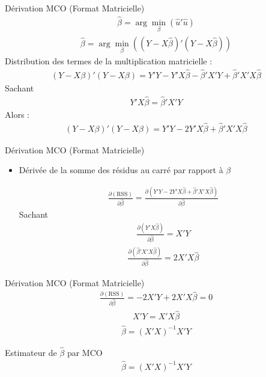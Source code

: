 \documentclass{beamer}
\begin{document}
\begin{frame}{Dérivation MCO (Format Matricielle)}
\begin{align*}
  \hat{\beta} = \arg\min_{\beta} (\hat{u}'\hat{u})
\end{align*}
\begin{align*}
  \hat{\beta} = \arg\min_{\beta} \left( (Y - X \hat{\beta})' (Y - X \hat{\beta}) \right)
\end{align*}
Distribution des termes de la multiplication matricielle :
\begin{align*}
  (Y - X \beta)' (Y - X \beta) = Y'Y - Y'X \hat{\beta} - \hat{\beta}'X'Y + \hat{\beta}'X'X \hat{\beta}
\end{align*}
Sachant 
\begin{align*}
  Y'X \hat{\beta} = \hat{\beta}'X'Y
\end{align*}
Alors :
\begin{align*}
  (Y - X \beta)' (Y - X \beta) = Y'Y - 2 Y'X \hat{\beta} + \hat{\beta}'X'X \hat{\beta}
\end{align*}
\end{frame}

\begin{frame}{Dérivation MCO (Format Matricielle)}
\begin{itemize}
  \item Dérivée de la somme des résidus au carré par rapport à \( \beta \)
  
  \begin{align*}
    \frac{\partial (\text{RSS})}{\partial \hat{\beta}} = \frac{\partial (Y'Y - 2 Y'X \hat{\beta} + \hat{\beta}'X'X \hat{\beta})}{\partial \hat{\beta}}
  \end{align*}
  Sachant
  \begin{align*}
    \frac{\partial (Y'X \hat{\beta})}{\partial \hat{\beta}} = X'Y
  \end{align*}
  \begin{align*}
    \frac{\partial (\hat{\beta}'X'X \hat{\beta})}{\partial \hat{\beta}} = 2 X'X \hat{\beta}
  \end{align*}
\end{itemize}
\end{frame}

\begin{frame}{Dérivation MCO (Format Matricielle)}
\begin{align*}
  \frac{\partial (\text{RSS})}{\partial \hat{\beta}} = -2 X'Y + 2 X'X \hat{\beta} = 0
\end{align*}
\begin{align*}
  X'Y = X'X \hat{\beta}
\end{align*}
\begin{align*}
  \hat{\beta} = (X'X)^{-1} X'Y
\end{align*}
\begin{block}{Estimateur de \( \hat{\beta} \) par MCO}
  \begin{align*}
    \hat{\beta} = (X'X)^{-1} X'Y
  \end{align*}
\end{block}
\end{frame}
\end{document}
